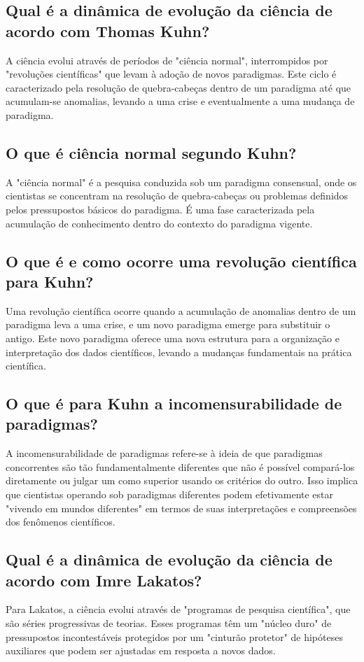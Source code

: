 \documentclass[a4paper,12pt]{article}[abntex2]
\begin{document}
\subsection{\textbf{Qual é a dinâmica de evolução da ciência de acordo com Thomas Kuhn?}}
A ciência evolui através de períodos de "ciência normal", interrompidos por "revoluções científicas" que levam à adoção de novos paradigmas. Este ciclo é caracterizado pela resolução de quebra-cabeças dentro de um paradigma até que acumulam-se anomalias, levando a uma crise e eventualmente a uma mudança de paradigma.
\subsection{\textbf{O que é ciência normal segundo Kuhn?}}
A "ciência normal" é a pesquisa conduzida sob um paradigma consensual, onde os cientistas se concentram na resolução de quebra-cabeças ou problemas definidos pelos pressupostos básicos do paradigma. É uma fase caracterizada pela acumulação de conhecimento dentro do contexto do paradigma vigente.
\subsection{\textbf{O que é e como ocorre uma revolução científica para Kuhn?}}
Uma revolução científica ocorre quando a acumulação de anomalias dentro de um paradigma leva a uma crise, e um novo paradigma emerge para substituir o antigo. Este novo paradigma oferece uma nova estrutura para a organização e interpretação dos dados científicos, levando a mudanças fundamentais na prática científica.
\subsection{\textbf{O que é para Kuhn a incomensurabilidade de paradigmas?}}
A incomensurabilidade de paradigmas refere-se à ideia de que paradigmas concorrentes são tão fundamentalmente diferentes que não é possível compará-los diretamente ou julgar um como superior usando os critérios do outro. Isso implica que cientistas operando sob paradigmas diferentes podem efetivamente estar "vivendo em mundos diferentes" em termos de suas interpretações e compreensões dos fenômenos científicos.
\subsection{\textbf{Qual é a dinâmica de evolução da ciência de acordo com Imre Lakatos?}}
Para Lakatos, a ciência evolui através de "programas de pesquisa científica", que são séries progressivas de teorias. Esses programas têm um "núcleo duro" de pressupostos incontestáveis protegidos por um "cinturão protetor" de hipóteses auxiliares que podem ser ajustadas em resposta a novos dados.
\end{document}
